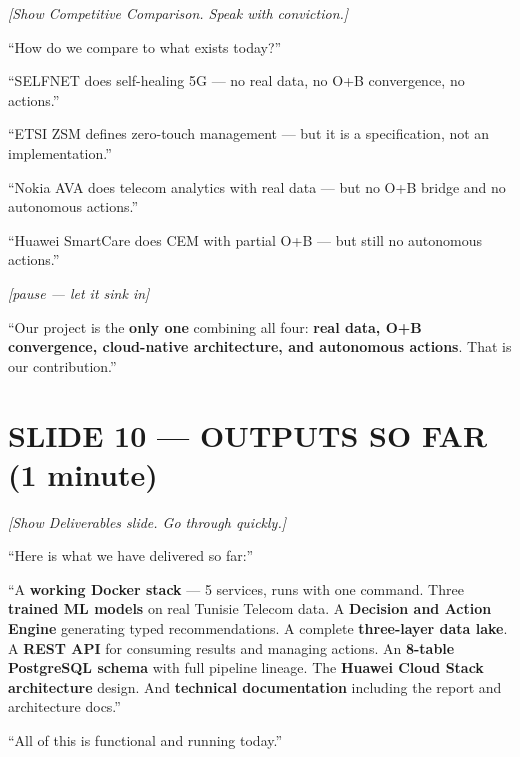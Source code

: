 \documentclass[12pt,a4paper]{article}
\newcommand{\stage}[1]{\par\textit{\color{stagedir}[#1]}\par}
\newcommand{\beat}{\par\vspace{0.4em}}
\newcommand{\pause}{\par\textit{\color{stagedir}[pause --- let it sink
            in]}\par}
\newcommand{\keyword}[1]{\textbf{\color{aiviolet}#1}}
\newcommand{\emphasis}[1]{\textbf{\color{huaweired}#1}}
\begin{document}
\stage{Show Competitive Comparison. Speak with conviction.}

``How do we compare to what exists today?''

\beat

``SELFNET does self-healing 5G --- no real data, no O+B convergence, no
actions.''

\beat

``ETSI ZSM defines zero-touch management --- but it is a specification, not an
implementation.''

\beat

``Nokia AVA does telecom analytics with real data --- but no O+B bridge and no
autonomous actions.''

\beat

``Huawei SmartCare does CEM with partial O+B --- but still no autonomous
actions.''

\pause

``Our project is the \emphasis{only one} combining all four: \keyword{real
    data, O+B convergence, cloud-native architecture, and autonomous actions}. That
is our contribution.''

\newpage
\section{SLIDE 10 --- OUTPUTS SO FAR (1 minute)}

\stage{Show Deliverables slide. Go through quickly.}

``Here is what we have delivered so far:''

\beat

``A \keyword{working Docker stack} --- 5 services, runs with one command. Three
\keyword{trained ML models} on real Tunisie Telecom data. A \keyword{Decision
    and Action Engine} generating typed recommendations. A complete
\keyword{three-layer data lake}. A \keyword{REST API} for consuming results and
managing actions. An \keyword{8-table PostgreSQL schema} with full pipeline
lineage. The \keyword{Huawei Cloud Stack architecture} design. And
\keyword{technical documentation} including the report and architecture docs.''

\beat

``All of this is functional and running today.''

\newpage
\end{document}
